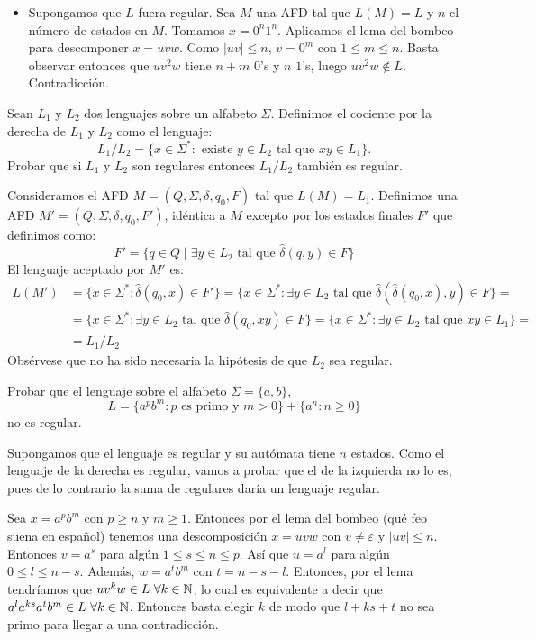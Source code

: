 \documentclass[twoside]{article}
\begin{document}
\begin{solucion}
\begin{itemize}
	\item Supongamos que $L$ fuera regular. Sea $M$ una AFD tal que $L(M)=L$ y $n$ el número de estados en $M$. Tomamos $x=0^n1^n$. Aplicamos el lema del bombeo para descomponer $x=uvw$. Como $|uv|≤n$, $v=0^m$ con $1≤m≤n$. Basta observar entonces que $uv^2w$ tiene $n+m$ $0$'s y $n$ $1$'s, luego $uv^2w \notin L$. Contradicción.
\end{itemize}
\end{solucion}

\newpage

\begin{ejercicio}{18}
Sean $L_1$ y $L_2$ dos lenguajes sobre un alfabeto $Σ$. Definimos el cociente por la derecha
de $L_1$ y $L_2$ como el lenguaje:
$$L_1/L_2 = \{x ∈ Σ^*
: \text{ existe } y ∈ L_2\text{ tal que }xy ∈ L_1\}.$$
Probar que si $L_1$ y $L_2$ son regulares entonces $L_1/L_2$ también es regular.
\end{ejercicio}
\begin{solucion}
Consideramos el AFD $M=(Q,Σ,δ,q_0,F)$ tal que $L(M)=L_1$. Definimos una AFD $M'=(Q,Σ,δ,q_0,F')$, idéntica a $M$ excepto por los estados finales $F'$ que definimos como:
\[ F' = \{q \in Q \mid \exists y \in L_2 \text{ tal que }\hat{δ}(q,y) \in F \}\]
El lenguaje aceptado por $M'$ es:
\begin{align*}
	L(M') & = \{x \in Σ^* : \hat{δ}(q_0,x) \in F'\} = \{x \in Σ^* : \exists y \in L_2 \text{ tal que } \hat{δ}(\hat{δ}(q_0,x),y) \in F\} =\\
	& = \{x \in Σ^* : \exists y \in L_2 \text{ tal que } \hat{δ}(q_0,xy) \in F\} = \{x \in Σ^* : \exists y \in L_2 \text{ tal que } xy \in L_1\}=\\
	& = L_1/L_2
\end{align*}
Obsérvese que no ha sido necesaria la hipótesis de que $L_2$ sea regular.
\end{solucion}

\newpage

\begin{ejercicio}{19}
Probar que el lenguaje sobre el alfabeto $Σ = \{a, b\}$,
$$L = \{a^pb^m : p \text{ es primo y }m > 0\} + \{a^n
: n ≥ 0\}$$
no es regular.
\end{ejercicio}
\begin{solucion}
Supongamos que el lenguaje es regular y su autómata tiene $n$ estados. Como el lenguaje de la derecha es regular, vamos a probar que el de la izquierda no lo es, pues de lo contrario la suma de regulares daría un lenguaje regular. 

Sea $x=a^pb^m$ con $p\geq n$ y $m\geq 1$. Entonces por el lema del bombeo (qué feo suena en español) tenemos una descomposición $x=uvw$ con $v\neq\varepsilon$ y $|uv|\leq n$. Entonces $v=a^s$ para algún $1\leq s\leq n\leq p$. Así que $u=a^l$ para algún $0\leq l\leq n-s$. Además, $w=a^tb^m$ con $t=n-s-l$. Entonces, por el lema tendríamos que $uv^kw\in L\ \forall k\in\mathbb{N}$, lo cual es equivalente a decir que $a^la^{ks}a^tb^m\in L\ \forall k\in\mathbb{N}$. Entonces basta elegir $k$ de modo que $l+ks+t$ no sea primo para llegar a una contradicción.
\end{solucion}
\end{document}
